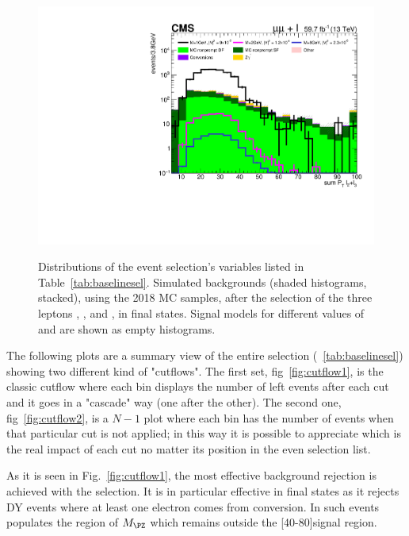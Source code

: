 \begin{figure}[h]
{  \includegraphics[width=.28\textwidth]{Figures/c6/selection/18/mu_sum_Pt_L2L3__0.pdf}}\\
  \caption{Distributions of the event selection's variables listed in
    Table~\ref{tab:baselinesel}. Simulated backgrounds (shaded histograms, stacked),
    using the 2018 MC samples, 
    after the selection of the three leptons \lone, \ltwo, and \lthree,
    in \mmx final states.
    Signal models for different values of \mhnl and \mixpar are shown
    as empty histograms.}
  \label{fig:selection_muons}
\end{figure}

The following plots are a summary view of the entire selection
(~\ref{tab:baselinesel}) showing two different kind of "cutflows". The
first set, fig~\ref{fig:cutflow1}, is the classic cutflow where each
bin displays the number of left events after each cut and it goes in a
"cascade" way (one after the other). The second one,
fig~\ref{fig:cutflow2}, is a $N-1$ plot where each bin has the number
of events when that particular cut is not applied; in this way it is
possible to appreciate which is the real impact of each cut no matter
its position in the even selection list. 

As it is seen in Fig.~\ref{fig:cutflow1}, the most effective background rejection is achieved with the \mthreel selection. It is in particular effective in \eex final states as it rejects DY events where at least one electron comes from conversion. In such events \mthreel populates the region of $M_{\PZ}$ which remains outside the [40-80]\GeV signal region.

